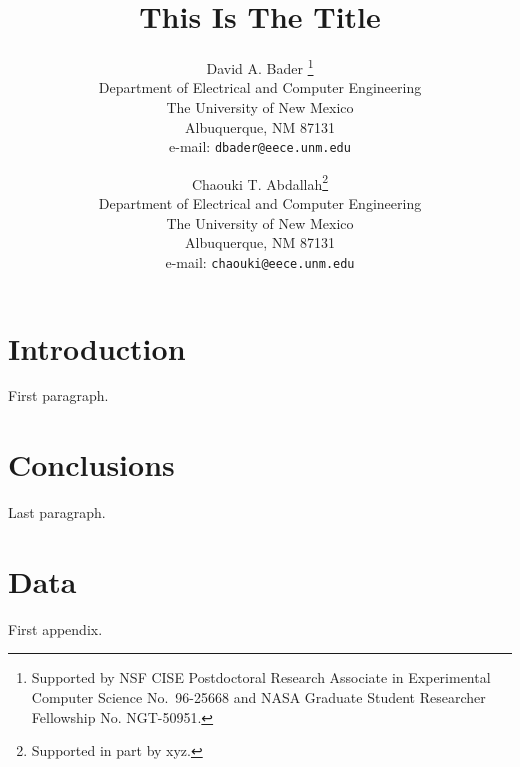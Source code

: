 \documentclass{eeceTR}
\title{This Is The Title}
\author{David A. Bader \thanks{Supported by  NSF CISE Postdoctoral Research Associate in Experimental Computer
Science No.~96-25668 and NASA Graduate Student Researcher Fellowship
No. NGT-50951.}\\
Department of Electrical and Computer Engineering\\
The University of New Mexico\\
Albuquerque, NM 87131\\
e-mail: {\tt dbader@eece.unm.edu}
\and
Chaouki T. Abdallah\thanks{Supported in part by xyz.}\\
Department of Electrical and Computer Engineering\\
The University of New Mexico\\
Albuquerque, NM 87131\\
e-mail: {\tt chaouki@eece.unm.edu}
}
\begin{document}
\maketitle
\makeabstract

\section{Introduction}

First paragraph. \cite{JAJA92}

\section{Conclusions}

Last paragraph.

\appendix

\section{Data}
First appendix.



\end{document}
